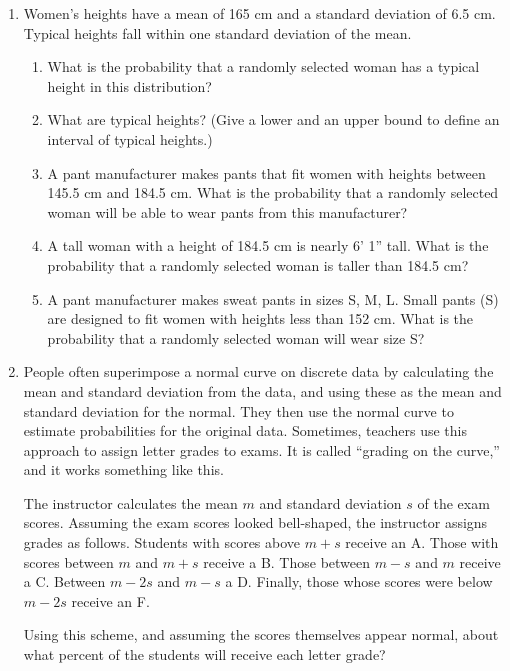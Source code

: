 \begin{enumerate}
\item Women's heights have a mean of 165 cm and a standard deviation of 6.5 cm. Typical heights fall within one standard deviation of the mean. 
\begin{enumerate}
\item What is the probability that a randomly selected woman has a typical height in this distribution? \\[1.5in]
\item What are typical heights? (Give a lower and an upper bound to define an interval of typical heights.) \\[1.5in]
\item A pant manufacturer makes pants that fit women with heights between 145.5 cm and 184.5 cm. What is the probability that a randomly selected woman will be able to wear pants from this manufacturer?  \\[1.5in]
\item A tall woman with a height of 184.5 cm is nearly 6' 1'' tall. What is the probability that a randomly selected woman is taller than 184.5 cm? \\[1.5in]
\item A pant manufacturer makes sweat pants in sizes S, M, L. Small pants (S) are designed to fit women with heights less than 152 cm. What is the probability that a randomly selected woman will wear size S? \\[1.5in]
\end{enumerate}
\item People often superimpose a normal curve on discrete data by calculating the mean and standard deviation from the data, and using these as the mean and standard deviation for the normal. They then use the normal curve to estimate probabilities for the original data. Sometimes, teachers use this approach to assign letter grades to exams. It is called ``grading on the curve,'' and it works something like this.

The instructor calculates the mean $m$ and standard deviation $s$ of the exam scores. Assuming the exam scores looked bell-shaped, the instructor assigns grades as follows. Students with scores above $m+s$ receive an A. Those with scores between $m$ and $m+s$ receive a B. Those between $m-s$ and $m$ receive a C. Between $m-2s$ and $m-s$ a D. Finally, those whose scores were below $m-2s$ receive an F.

Using this scheme, and assuming the scores themselves appear normal, about what percent of the students will receive each letter grade?
\end{enumerate}

